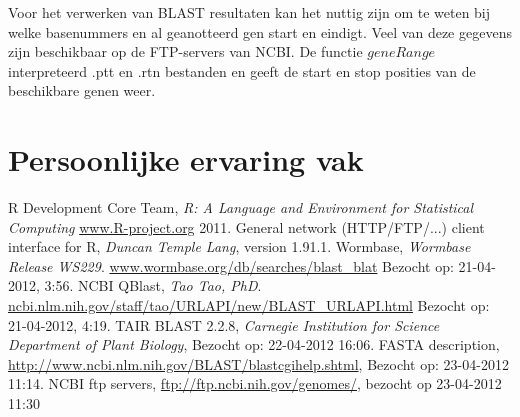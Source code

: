 \documentclass[a4paper]{article}
\begin{document}
Voor het verwerken van BLAST resultaten kan het nuttig zijn om te weten bij welke basenummers en al geanotteerd gen start en eindigt. Veel van deze gegevens zijn beschikbaar op de FTP-servers van NCBI\cite{NCBIftp}. De functie $geneRange$ interpreteerd .ptt en .rtn bestanden en geeft de start en stop posities van de beschikbare genen weer.

\section*{Persoonlijke ervaring vak}


\renewcommand{\refname}{Referenties}
\begin{thebibliography}{9}
    R Development Core Team, \emph{R: A Language and Environment for Statistical Computing}
    \url{www.R-project.org} 2011.
    General network (HTTP/FTP/...) client interface for R, \emph{Duncan Temple Lang}, version 1.91.1.
    Wormbase, \emph{Wormbase Release WS229}. \url{www.wormbase.org/db/searches/blast_blat} Bezocht op: 21-04-2012, 3:56.
    NCBI QBlast, \emph{Tao Tao, PhD}. \url{ncbi.nlm.nih.gov/staff/tao/URLAPI/new/BLAST_URLAPI.html} Bezocht op: 21-04-2012, 4:19.
    TAIR BLAST 2.2.8, \emph{Carnegie Institution for Science Department of Plant Biology}, Bezocht op: 22-04-2012 16:06.
    FASTA description, \url{http://www.ncbi.nlm.nih.gov/BLAST/blastcgihelp.shtml}, Bezocht op: 23-04-2012 11:14.
    NCBI ftp servers, \url{ftp://ftp.ncbi.nih.gov/genomes/}, bezocht op 23-04-2012 11:30
  
\end{thebibliography}
\end{document}
